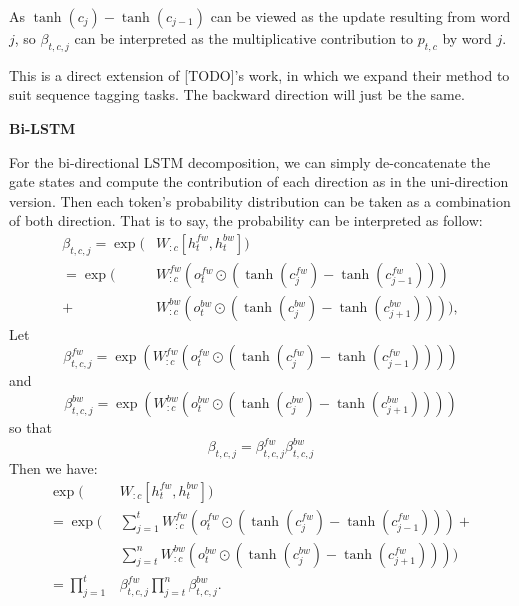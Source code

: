 \documentclass{article}
\begin{document}
As $\tanh(c_j) - \tanh(c_{j-1})$ can be viewed as the update resulting from word $j$, so $\beta_{t, c, j}$ can be interpreted as the multiplicative contribution to $p_{t, c}$ by word $j$. 

This is a direct extension of [TODO]'s work, in which we expand their method to suit sequence tagging tasks.
The backward direction will just be the same.

\textbf{Bi-LSTM}

For the bi-directional LSTM decomposition, we can simply de-concatenate the gate states and compute the contribution of each direction as in the uni-direction version. Then each token's probability distribution can be taken as a combination of both direction. That is to say, the probability can be interpreted as follow:
\begin{align}\label{eq:bi-beta} 
\beta_{t, c, j} = \exp(&W_{:c} [h_t^{fw}, h_t^{bw}])\\
= \exp(&W_{:c}^{fw} (o_t^{fw} \odot (\tanh(c_j^{fw})- \tanh(c_{j-1}^{fw}))) \\
+ &W_{:c}^{bw} (o_t^{bw} \odot (\tanh(c_j^{bw})- \tanh(c_{j+1}^{bw})))),
\end{align}
Let
\begin{equation}
\beta_{t, c, j}^{fw} = \exp(W_{:c}^{fw} (o_t^{fw} \odot (\tanh(c_j^{fw})- \tanh(c_{j-1}^{fw}))))
\end{equation}
and
\begin{equation}
\beta_{t, c, j}^{bw} = \exp(W_{:c}^{bw} (o_t^{bw} \odot (\tanh(c_j^{bw})- \tanh(c_{j+1}^{bw}))))
\end{equation}
so that 
\begin{equation}
\beta_{t, c, j} = \beta_{t, c, j}^{fw} \beta_{t, c, j}^{bw}
\end{equation}
Then we have:
\begin{align}
	\exp(&W_{:c} [h_t^{fw}, h_t^{bw}]) \\
= \exp(&\sum_{j=1}^t W_{:c}^{fw} (o_t^{fw} \odot (\tanh(c_j^{fw}) - \tanh(c_{j-1}^{fw}))) +\\
	&\sum_{j=t}^n W_{:c}^{bw} (o_t^{bw} \odot (\tanh(c_j^{bw}) - \tanh(c_{j+1}^{fw}))))\\
= \prod_{j=1}^t &\beta_{t, c, j}^{fw} \prod_{j=t}^n \beta_{t, c, j}^{bw}.
\end{align}
\end{document}
